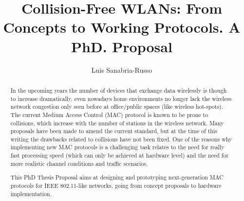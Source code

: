 \documentclass[]{llncs}
\begin{document}
\title{Collision-Free WLANs: From Concepts to Working Protocols. A PhD. Proposal}
\author{Luis Sanabria-Russo}
\maketitle

\begin{abstract}
In the upcoming years the number of devices that exchange data wirelessly is though to increase dramatically, even nowadays home environments no longer lack the wireless network congestion only seen before at office/public spaces (like wireless hot-spots). The current Medium Access Control (MAC) protocol is known to be prone to collisions, which increase with the number of stations in the wireless network. Many proposals have been made to amend the current standard, but at the time of this writing the drawbacks related to collisions have not been fixed. One of the reasons why implementing new MAC protocols is a challenging task relates to the need for really fast processing speed (which can only be achieved at hardware level) and the need for more realistic channel conditions and traffic scenarios.

This PhD Thesis Proposal aims at designing and prototyping next-generation MAC protocols for IEEE 802.11-like networks, going from concept proposals to hardware implementation.



\end{abstract}
\end{document}

